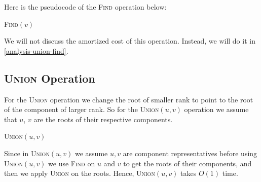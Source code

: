 Here is the pseudocode of the \textsc{Find} operation below:
\begin{algorithm}[]
	\caption{\textsc{Find}$(v)$}
	\DontPrintSemicolon
\end{algorithm}We will not discuss the amortized cost of this operation. Instead, we will do it in \autoref{analysis-union-find}.
\subsection{\textsc{Union} Operation}
For the \textsc{Union} operation we change the root of smaller rank to point to the root of the component of larger rank. So for the \textsc{Union}$(u,v)$ operation we assume that $u$, $v$ are the roots of their respective components. 
\begin{algorithm}[]
	\caption{\textsc{Union}$(u,v)$}
	\DontPrintSemicolon
\end{algorithm}
Since in \textsc{Union}$(u,v)$ we assume $u,v$ are component representatives before using \textsc{Union}$(u,v)$ we use \textsc{Find} on $u$ and $v$ to get the roots of their components, and then we apply \textsc{Union} on the roots. Hence, \textsc{Union}$(u,v)$ takes $O(1)$ time.
